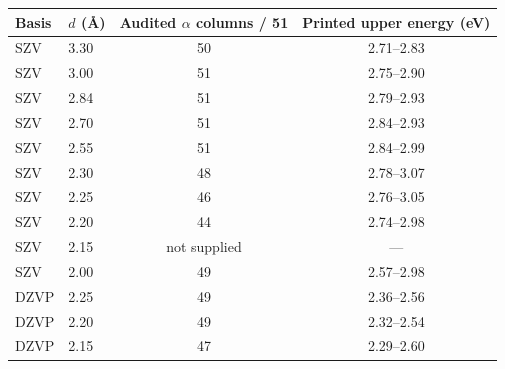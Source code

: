 \begin{tabular}{llcc}
Basis & $d$ (\AA) & Audited $\alpha$ columns / 51 & Printed upper energy (eV) \\
\hline
SZV & 3.30 & 50 & 2.71--2.83 \\
SZV & 3.00 & 51 & 2.75--2.90 \\
SZV & 2.84 & 51 & 2.79--2.93 \\
SZV & 2.70 & 51 & 2.84--2.93 \\
SZV & 2.55 & 51 & 2.84--2.99 \\
SZV & 2.30 & 48 & 2.78--3.07 \\
SZV & 2.25 & 46 & 2.76--3.05 \\
SZV & 2.20 & 44 & 2.74--2.98 \\
SZV & 2.15 & not supplied & --- \\
SZV & 2.00 & 49 & 2.57--2.98 \\
DZVP & 2.25 & 49 & 2.36--2.56 \\
DZVP & 2.20 & 49 & 2.32--2.54 \\
DZVP & 2.15 & 47 & 2.29--2.60 \\
\end{tabular}
